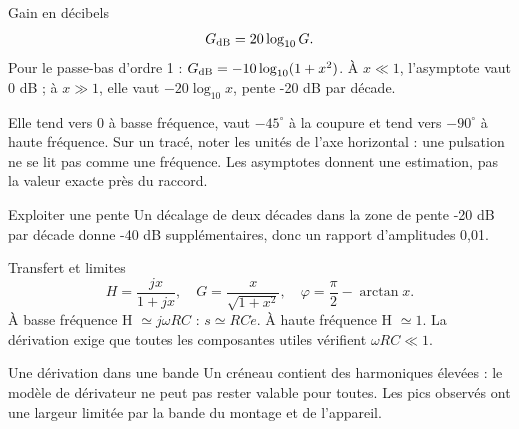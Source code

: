 \begin{loi}{Gain en décibels}
\[G_{\rm dB}=20\log_{10}G.\]Pour le passe-bas d’ordre 1 : $G_{\rm dB}=-10\log_{10}(1+x^2)$. À $x\ll1$, l’asymptote vaut 0 dB ; à $x\gg1$, elle vaut $-20\log_{10}x$, pente -20 dB par décade.
\end{loi}
Elle tend vers 0 à basse fréquence, vaut $-45^\circ$ à la coupure et tend vers $-90^\circ$ à haute fréquence. Sur un tracé, noter les unités de l’axe horizontal : une pulsation ne se lit pas comme une fréquence. Les asymptotes donnent une estimation, pas la valeur exacte près du raccord.
\begin{methode}{Exploiter une pente}
Un décalage de deux décades dans la zone de pente -20 dB par décade donne -40 dB supplémentaires, donc un rapport d’amplitudes 0,01.
\end{methode}


\begin{loi}{Transfert et limites}
\[H=\frac{jx}{1+jx},\quad G=\frac{x}{\sqrt{1+x^2}},\quad\varphi=\frac\pi2-\arctan x.\]À basse fréquence H $\simeq j\omega RC$ : $s\simeq RC\dot e$. À haute fréquence H $\simeq1$. La dérivation exige que toutes les composantes utiles vérifient $\omega RC\ll1$.
\end{loi}
\begin{piege}{Une dérivation dans une bande}
Un créneau contient des harmoniques élevées : le modèle de dérivateur ne peut pas rester valable pour toutes. Les pics observés ont une largeur limitée par la bande du montage et de l’appareil.
\end{piege}


